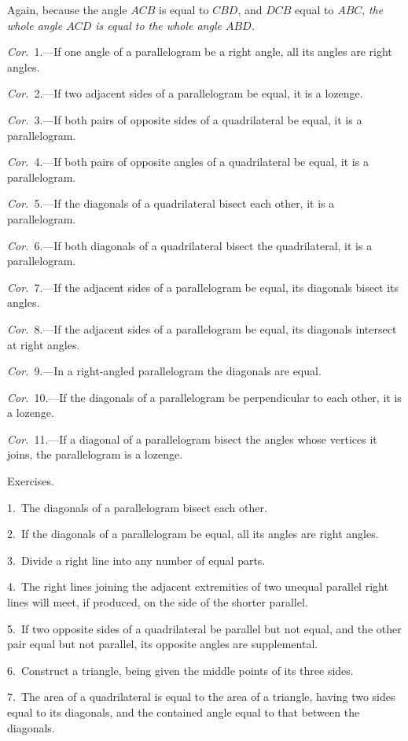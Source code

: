 \documentclass[oneside]{book}
\newcommand\exhead[1]{
\Needspace*{5\baselineskip}\begin{center}
\textsf{#1}
\end{center}
}
\begin{document}
Again, because the angle $ACB$ is equal to $CBD$, and
$DCB$ equal to $ABC$, \emph{the whole angle $ACD$ is equal to the
whole angle $ABD$.}

\textit{Cor.}~1.---If one angle of a parallelogram be a right
angle, all its angles are right angles.

\textit{Cor.}~2.---If two adjacent sides of a parallelogram be
equal, it is a lozenge.



\textit{Cor.}~3.---If both pairs of opposite sides of a quadrilateral
be equal, it is a parallelogram.

\textit{Cor.}~4.---If both pairs of opposite angles of a quadrilateral
be equal, it is a parallelogram.

\textit{Cor.}~5.---If the diagonals of a quadrilateral bisect
each other, it is a parallelogram.

\textit{Cor.}~6.---If both diagonals of a quadrilateral bisect
the quadrilateral, it is a parallelogram.

\textit{Cor.}~7.---If the adjacent sides of a parallelogram be
equal, its diagonals bisect its angles.

\textit{Cor.}~8.---If the adjacent sides of a parallelogram be
equal, its diagonals intersect at right angles.

\textit{Cor.}~9.---In a right-angled parallelogram the diagonals
are equal.

\textit{Cor.}~10.---If the diagonals of a parallelogram be perpendicular
to each other, it is a lozenge.

\textit{Cor.}~11.---If a diagonal of a parallelogram bisect the
angles whose vertices it joins, the parallelogram is a
lozenge.

\exhead{Exercises.}

\begin{footnotesize}
1.~The diagonals of a parallelogram bisect each other.

2.~If the diagonals of a parallelogram be equal, all its angles
are right angles.

3.~Divide a right line into any number of equal parts.

4.~The right lines joining the adjacent extremities of two
unequal parallel right lines will meet, if produced, on the side
of the shorter parallel.

5.~If two opposite sides of a quadrilateral be parallel but not
equal, and the other pair equal but not parallel, its opposite angles
are supplemental.

6.~Construct a triangle, being given the middle points of its
three sides.

7.~The area of a quadrilateral is equal to the area of a triangle,
having two sides equal to its diagonals, and the contained angle
equal to that between the diagonals.
\par\end{footnotesize}
\end{document}
